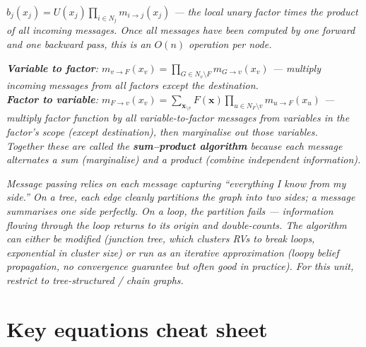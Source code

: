 \documentclass[11pt, a4paper]{article}
\begin{document}
\begin{exambox}
\textit{$b_j(x_j) = U(x_j)\prod_{i\in N_j} m_{i\to j}(x_j)$ — the local unary factor times the product of all incoming messages. Once all messages have been computed by one forward and one backward pass, this is an $O(n)$ operation per node.}
\end{exambox}

\begin{exambox}
\textit{\textbf{Variable to factor}: $m_{v\to F}(x_v) = \prod_{G\in N_v\setminus F} m_{G\to v}(x_v)$ — multiply incoming messages from all factors except the destination.}\\[0.3em]
\textit{\textbf{Factor to variable}: $m_{F\to v}(x_v) = \sum_{\mathbf{x}_{\setminus v}} F(\mathbf{x})\prod_{u\in N_F\setminus v} m_{u\to F}(x_u)$ — multiply factor function by all variable-to-factor messages from variables in the factor's scope (except destination), then marginalise out those variables.}\\[0.3em]
\textit{Together these are called the \textbf{sum--product algorithm} because each message alternates a sum (marginalise) and a product (combine independent information).}
\end{exambox}

\begin{exambox}
\textit{Message passing relies on each message capturing ``everything I know from my side.'' On a tree, each edge cleanly partitions the graph into two sides; a message summarises one side perfectly. On a loop, the partition fails — information flowing through the loop returns to its origin and double-counts. The algorithm can either be modified (junction tree, which clusters RVs to break loops, exponential in cluster size) or run as an iterative approximation (loopy belief propagation, no convergence guarantee but often good in practice). For this unit, restrict to tree-structured / chain graphs.}
\end{exambox}

\section*{Key equations cheat sheet}
\end{document}
